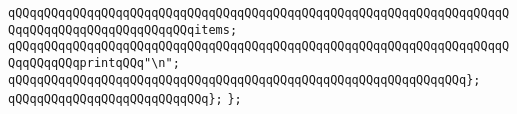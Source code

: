 \verb|qQQqqQQqqQQqqQQqqQQqqQQqqQQqqQQqqQQqqQQqqQQqqQQqqQQqqQQqqQQqqQQqqQQqqQQqqQQqqQQqqQQqqQQqqQQqqQQqitems;|\newline
\newline
\verb|qQQqqQQqqQQqqQQqqQQqqQQqqQQqqQQqqQQqqQQqqQQqqQQqqQQqqQQqqQQqqQQqqQQqqQQqqQQqqQQqprintqQQq"\n";|\newline
\verb|qQQqqQQqqQQqqQQqqQQqqQQqqQQqqQQqqQQqqQQqqQQqqQQqqQQqqQQqqQQqqQQq};|\newline
\verb|qQQqqQQqqQQqqQQqqQQqqQQqqQQq};|\newline
\verb|};|\newline

